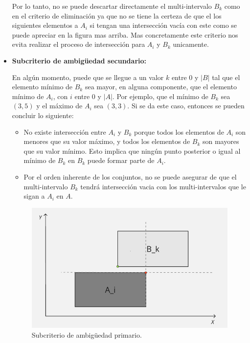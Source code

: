 \begin{itemize}
\begin{figure}[h]
    \end{figure}

    Por lo tanto, no se puede descartar directamente el multi-intervalo $B_k$ como en el criterio de eliminación ya que no se tiene la certeza de que el los siguientes elementos a $A_i$ si tengan una intersección vacía con este como se puede apreciar en la figura mas arriba. Mas concretamente este criterio nos evita realizar el proceso de intersección para $A_i$ y  $B_k$ unicamente.
    

    \item \textbf{Subcriterio de ambigüedad secundario:} 

    En algún momento, puede que se llegue a un valor $k$ entre 0 y $|B|$ tal que el elemento mínimo de $B_k$ sea mayor, en alguna componente, que el elemento mínimo de $A_i$, con $i$ entre 0 y $|A|$. Por ejemplo, que el mínimo de $B_k$ sea $(3,5)$ y el máximo de $A_i$ sea $(3,3)$. Si se da este caso, entonces se pueden concluir lo siguiente:

    \begin{itemize}
    \item No existe intersección entre $A_i$ y $B_k$ porque todos los elementos de $A_i$ son menores que su valor máximo, y todos los elementos de $B_k$ son mayores que su valor mínimo. Esto implica que ningún punto posterior o igual al mínimo de $B_k$ en $B_k$ puede formar parte de $A_i$.
    
    \item Por el orden inherente de los conjuntos, no se puede asegurar de que el multi-intervalo $B_k$ tendrá intersección vacia con los multi-intervalos que le sigan a $A_i$ en $A$.
    \end{itemize}

    \begin{figure}[h]
     \centering
    \includegraphics[width=0.6\linewidth]{figures/Optimazaciones/Interseccion/criterio de amb sec 1.png}\par
    \caption{Subcriterio de ambigüedad primario.}
    \label{fig:enter-label}


\end{figure}
\end{itemize}
